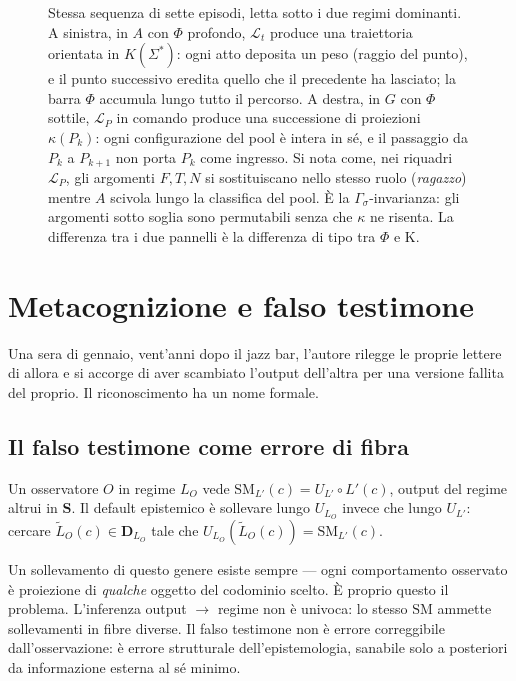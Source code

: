 \documentclass[
    oneside,                 %
    openany,                 %
    titlepage,
    11pt,
    a4paper,
    italian,
    DIV=14,                  %
    headinclude,
    footinclude=true,
    cleardoublepage=empty
]{scrbook}
\theoremstyle{ctplain}
\theoremstyle{ctdef}
\theoremstyle{ctrem}
\begin{document}
\begin{figure}[htbp]
\caption[Traiettorie di $\mathcal{L}_t$ e $\mathcal{L}_P$ a confronto]{%
Stessa sequenza di sette episodi, letta sotto i due regimi dominanti.
A sinistra, in $A$ con $\Phi$ profondo, $\mathcal{L}_t$ produce una traiettoria
orientata in $K(\Sigma^*)$: ogni atto deposita un peso (raggio del punto), e il
punto successivo eredita quello che il precedente ha lasciato; la barra $\Phi$
accumula lungo tutto il percorso. A destra, in $G$ con $\Phi$ sottile,
$\mathcal{L}_P$ in comando produce una successione di proiezioni
$\kappa(P_k)$: ogni configurazione del pool è intera in sé, e il passaggio
da $P_k$ a $P_{k+1}$ non porta $P_k$ come ingresso. Si nota come, nei
riquadri $\mathcal{L}_P$, gli argomenti $F, T, N$ si sostituiscano nello
stesso ruolo (\emph{ragazzo}) mentre $A$ scivola lungo la classifica del
pool. È la $\Gamma_\sigma$-invarianza: gli argomenti sotto soglia sono
permutabili senza che $\kappa$ ne risenta. La differenza tra i due
pannelli è la differenza di tipo tra $\Phi$ e $\mathrm{K}$.}
\label{fig:traiettorie}
\end{figure}

\chapter{Metacognizione e falso testimone}

Una sera di gennaio, vent'anni dopo il jazz bar, l'autore rilegge le proprie lettere di allora e si accorge di aver scambiato l'output dell'altra per una versione fallita del proprio. Il riconoscimento ha un nome formale.

\section*{Il falso testimone come errore di fibra}

Un osservatore $O$ in regime $L_O$ vede $\mathrm{SM}_{L'}(c) = U_{L'} \circ L'(c)$, output del regime altrui in $\mathbf{S}$. Il default epistemico è sollevare lungo $U_{L_O}$ invece che lungo $U_{L'}$: cercare $\tilde{L}_O(c) \in \mathbf{D}_{L_O}$ tale che $U_{L_O}(\tilde{L}_O(c)) = \mathrm{SM}_{L'}(c)$.

Un sollevamento di questo genere esiste sempre --- ogni comportamento osservato è proiezione di \emph{qualche} oggetto del codominio scelto. È proprio questo il problema. L'inferenza output $\to$ regime non è univoca: lo stesso $\mathrm{SM}$ ammette sollevamenti in fibre diverse. Il falso testimone non è errore correggibile dall'osservazione: è errore strutturale dell'epistemologia, sanabile solo a posteriori da informazione esterna al sé minimo.
\end{document}
